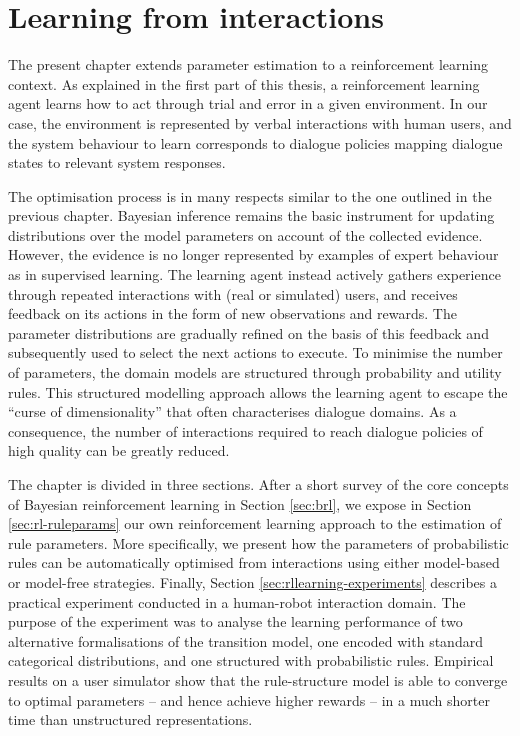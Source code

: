 \chapter{Learning from interactions}
\label{chap:rllearning}

The present chapter extends parameter estimation to a reinforcement learning context.  As explained in the first part of this thesis, a reinforcement learning agent learns how to act through trial and error in a given environment.  In our case, the environment is represented by verbal interactions with human users, and the system behaviour to learn corresponds to dialogue policies mapping dialogue states to relevant system responses. 

The optimisation process is in many respects similar to the one outlined in the previous chapter. Bayesian inference remains the basic instrument for updating distributions over the model parameters on account of the collected evidence.  However, the evidence is no longer represented by examples of expert behaviour as in supervised learning. The learning agent instead actively gathers experience through repeated interactions with (real or simulated) users, and receives feedback on its actions in the form of new observations and rewards. The parameter distributions are gradually refined on the basis of this feedback and subsequently used to select the next actions to execute. To minimise the number of parameters, the domain models are structured through probability and utility rules. This structured modelling approach allows the learning agent to  escape the ``curse of dimensionality'' that often characterises dialogue domains. As a consequence, the number of interactions required to reach dialogue policies of high quality can be greatly reduced. 

The chapter is divided in three sections.  After a short survey of the core concepts of Bayesian reinforcement learning in Section \ref{sec:brl}, we expose in Section \ref{sec:rl-ruleparams} our own reinforcement learning approach to the estimation of rule parameters.  More specifically, we present how the parameters of probabilistic rules can be automatically optimised from interactions using either model-based or model-free strategies. Finally, Section \ref{sec:rllearning-experiments} describes a practical experiment conducted in a human-robot interaction domain. The purpose of the experiment was to analyse the learning performance of two alternative formalisations of the transition model, one encoded with standard categorical distributions, and one structured with probabilistic rules. Empirical results on a user simulator show that the rule-structure model is able to converge to optimal parameters -- and hence achieve higher rewards -- in a much shorter time than unstructured representations. 

